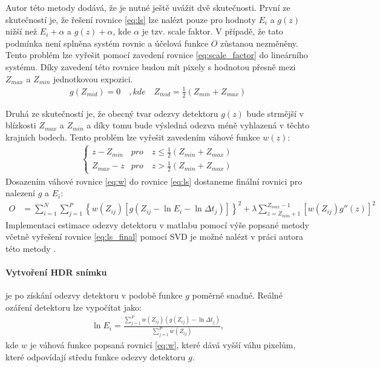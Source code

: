 Autor této metody dodává, že je nutné ještě uvážit dvě skutečnosti. První ze skutečností je, že řešení rovnice \ref{eq:ls} lze nalézt pouze pro hodnoty $E_i$ a $g\left( z \right)$ nižší než $E_i + \alpha$ a $g\left( z \right)+ \alpha$, kde $\alpha$ je tzv. scale faktor. V případě, že tato podmínka není splněna systém rovnic a účelová funkce $O$ zůstanou nezměněny. Tento problém lze vyřešit pomocí zavedení rovnice \ref{eq:scale_factor} do lineárního systému. Díky zavedení této rovnice budou mít pixely s hodnotou přesně mezi $Z_{max}$ a $Z_{min}$ jednotkovou expozici. \cite{Debevec}
\begin{align}
\label{eq:scale_factor}
g \left( Z_{mid} \right) = 0 \quad, kde \quad Z_{mid} = \frac{1}{2} \left( Z_{min} + Z_{max} \right) 
\end{align}

Druhá ze skutečností je, že obecný tvar odezvy detektoru $g \left( z \right)$ bude strmější v blízkosti $Z_{max}$ a $Z_{min}$ a díky tomu bude výsledná odezva méně vyhlazená v těchto krajních bodech. Tento problém lze vyřešit zavedením váhové funkce $w \left( z\right)$:
\begin{align}
\label{eq:w}
\left\{\begin{matrix}
z - Z_{min} & pro \quad z \leq \frac{1}{2} \left(Z_{min} + Z_{max} \right )\\ 
Z_{max} - z & pro \quad z > \frac{1}{2} \left(Z_{min} + Z_{max} \right )
\end{matrix}\right.
\end{align}
Dosazením váhové rovnice \ref{eq:w} do rovnice \ref{eq:ls} dostaneme finální rovnici pro nalezení $g$ a $E_i$:
\begin{align}
\label{eq:ls_final}
O &= \sum_{i=1}^{N} \sum_{j=1}^{P} \left \{ w \left(Z_{ij} \right ) \left [g \left(Z_{ij}-\ln E_i - \ln\Delta t_j \right ) \right ] \right \}^2 
+ \lambda \sum_{z=Z_{min}+1}^{Z_{max}-1}\left [w \left(Z_{ij} \right ){g}'' \left(z \right ) \right ]^2
\end{align}
Implementaci estimace odezvy detektoru v matlabu pomocí výše popsané metody včetně vyřešení rovnice \ref{eq:ls_final} pomocí SVD je možné nalézt v práci autora této metody \cite{Debevec}.

\paragraph{Vytvoření HDR snímku}
je po získání odezvy detektoru v podobě funkce $g$ poměrně snadné. Reálné ozáření detektoru lze vypočítat jako:
\begin{align}
\label{eq:calc}
\ln E_i=\frac{\sum_{j=1}^{P} w \left(Z_{ij} \right ) \left(g \left(Z_{ij} \right ) - \ln \Delta t_j\right )}{\sum_{j=1}^{P} w \left(Z_{ij} \right )},
\end{align}
kde $w$ je váhová funkce popsaná rovnicí \ref{eq:w}, které dává vyšší váhu pixelům, které odpovídají středu funkce odezvy detektoru $g$.

